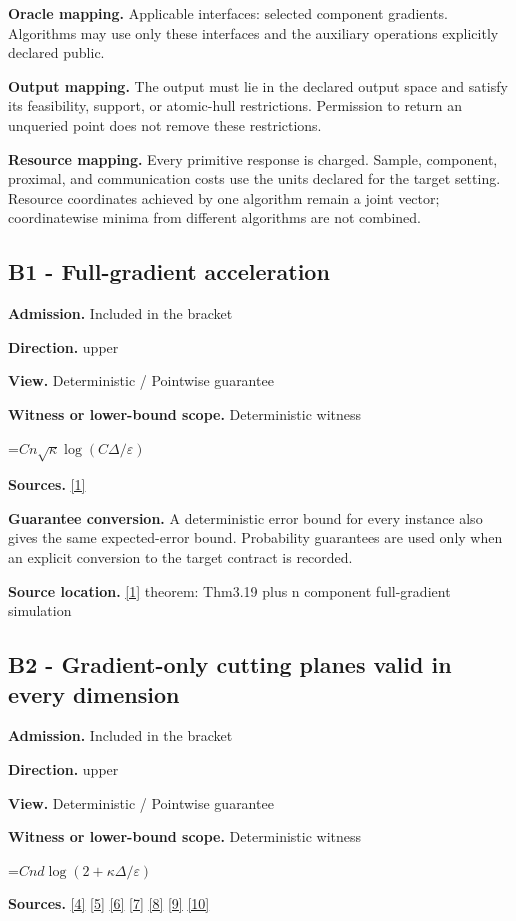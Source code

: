 \documentclass[10pt,a4paper]{article}
\newcommand{\AtlasMath}[1]{\par\begingroup\centering\setbox0=\hbox{$\displaystyle #1$}\ifdim\wd0>1.4\linewidth\typeout{ATLAS WIDE FORMULA: \the\wd0}\fi\ifdim\wd0>\linewidth\resizebox{\linewidth}{!}{\box0}\else\box0\fi\par\endgroup}
\begin{document}
\textbf{Oracle mapping.} Applicable interfaces: selected component gradients. Algorithms may use only these interfaces and the auxiliary operations explicitly declared public.

\textbf{Output mapping.} The output must lie in the declared output space and satisfy its feasibility, support, or atomic-hull restrictions. Permission to return an unqueried point does not remove these restrictions.

\textbf{Resource mapping.} Every primitive response is charged. Sample, component, proximal, and communication costs use the units declared for the target setting. Resource coordinates achieved by one algorithm remain a joint vector; coordinatewise minima from different algorithms are not combined.

\subsection{B1 - Full-gradient acceleration}
\textbf{Admission.} Included in the bracket

\textbf{Direction.} upper

\textbf{View.} Deterministic / Pointwise guarantee

\textbf{Witness or lower-bound scope.} Deterministic witness

\AtlasMath{Cn\sqrt\kappa\log(C\Delta/\varepsilon)}
\textbf{Sources.} \href{https://arxiv.org/pdf/1405.4980}{[1]}

\textbf{Guarantee conversion.} A deterministic error bound for every instance also gives the same expected-error bound. Probability guarantees are used only when an explicit conversion to the target contract is recorded.

\textbf{Source location.} \href{https://arxiv.org/pdf/1405.4980}{[1]} theorem: Thm3.19 plus n component full-gradient simulation

\subsection{B2 - Gradient-only cutting planes valid in every dimension}
\textbf{Admission.} Included in the bracket

\textbf{Direction.} upper

\textbf{View.} Deterministic / Pointwise guarantee

\textbf{Witness or lower-bound scope.} Deterministic witness

\AtlasMath{Cnd\log(2+\kappa\Delta/\varepsilon)}
\textbf{Sources.} \href{https://proceedings.mlr.press/v97/zhou19b/zhou19b.pdf}{[4]} \href{https://arxiv.org/pdf/1405.4980}{[5]} \href{https://arxiv.org/pdf/2101.09740v2}{[6]} \href{https://arxiv.org/pdf/2609.33360v2}{[7]} \href{https://arxiv.org/pdf/2609.10874}{[8]} \href{https://www2.isye.gatech.edu/~nemirovs/MOR_AccuracyCertificates.pdf}{[9]} \href{https://arxiv.org/pdf/2609.20701}{[10]}
\end{document}

